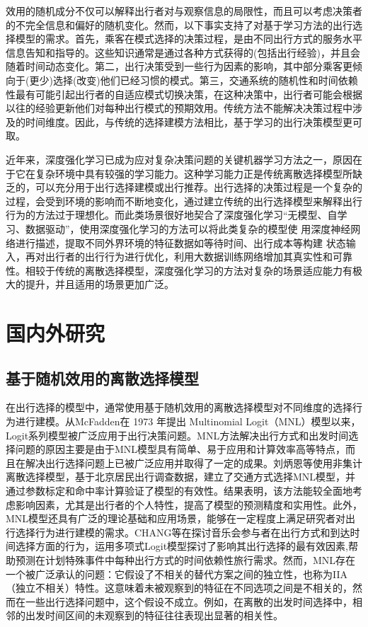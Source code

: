 效用的随机成分不仅可以解释出行者对与观察信息的局限性，而且可以考虑决策者的不完全信息和偏好的随机变化。然而，以下事实支持了对基于学习方法的出行选择模型的需求。首先，乘客在模式选择的决策过程，是由不同出行方式的服务水平信息告知和指导的。这些知识通常是通过各种方式获得的(包括出行经验)，并且会随着时间动态变化。第二，出行决策受到一些行为因素的影响，其中部分乘客更倾向于(更少)选择(改变)他们已经习惯的模式。第三，交通系统的随机性和时间依赖性最有可能引起出行者的自适应模式切换决策，在这种决策中，出行者可能会根据以往的经验更新他们对每种出行模式的预期效用。传统方法不能解决决策过程中涉及的时间维度。因此，与传统的选择建模方法相比，基于学习的出行决策模型更可取。

近年来，深度强化学习已成为应对复杂决策问题的关键机器学习方法之一，原因在于它在复杂环境中具有较强的学习能力。这种学习能力正是传统离散选择模型所缺乏的，可以充分用于出行选择建模或出行推荐。出行选择的决策过程是一个复杂的过程，会受到环境的影响而不断地变化，通过建立传统的出行选择模型来解释出行行为的方法过于理想化。而此类场景很好地契合了深度强化学习“无模型、自学习、数据驱动”，使用深度强化学习的方法可以将此类复杂的模型使 用深度神经网络进行描述，提取不同外界环境的特征数据如等待时间、出行成本等构建 状态输入，再对出行者的出行行为进行优化，利用大数据训练网络增加其真实性和可靠性。相较于传统的离散选择模型，深度强化学习的方法对复杂的场景适应能力有极大的提升，并且适用的场景更加广泛。


\section{国内外研究}

\subsection{基于随机效用的离散选择模型}
在出行选择的模型中，通常使用基于随机效用的离散选择模型对不同维度的选择行为进行建模。从McFadden\cite{mcfadden1973conditional}在 1973 年提出 Multinomial Logit（MNL）模型以来，Logit系列模型被广泛应用于出行决策问题。MNL方法解决出行方式和出发时间选择问题的原因主要是由于MNL模型具有简单、易于应用和计算效率高等特点，而且在解决出行选择问题上已被广泛应用并取得了一定的成果。刘炳恩等\cite{GLJK200805021}使用非集计离散选择模型，基于北京居民出行调查数据，建立了交通方式选择MNL模型，并通过参数标定和命中率计算验证了模型的有效性。结果表明，该方法能较全面地考虑影响因素，尤其是出行者的个人特性，提高了模型的预测精度和实用性。此外，MNL模型还具有广泛的理论基础和应用场景，能够在一定程度上满足研究者对出行选择行为进行建模的需求。CHANG等\cite{MeiShiangCHANG2013}在探讨音乐会参与者在出行方式和到达时间选择方面的行为，运用多项式Logit模型探讨了影响其出行选择的最有效因素,帮助预测在计划特殊事件中每种出行方式的时间依赖性旅行需求。然而，MNL存在一个被广泛承认的问题：它假设了不相关的替代方案之间的独立性，也称为IIA（独立不相关）特性。这意味着未被观察到的特征在不同选项之间是不相关的，然而在一些出行选择问题中，这个假设不成立。例如，在离散的出发时间选择中，相邻的出发时间区间的未观察到的特征往往表现出显著的相关性。

